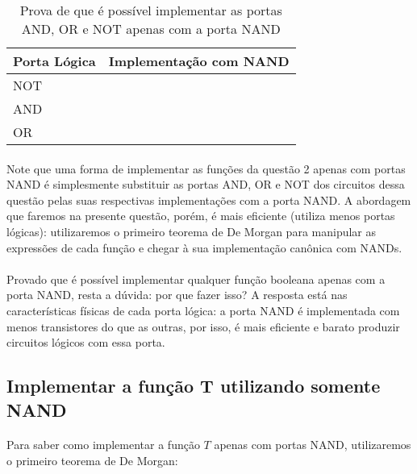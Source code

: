 \documentclass[a4paper, 12pt]{article}
\begin{document}
\begin{table}[H]
    \centering
    \begin{tabular}{|>{\centering\arraybackslash}m{}|>{\centering\arraybackslash}m{}|}
        \hline
        Porta Lógica & Implementação com NAND \\ \hline
        NOT &  \\ \hline
        AND &  \\ \hline
        OR &  \\ \hline
    \end{tabular}
    \caption{Prova de que é possível implementar as portas AND, OR e NOT apenas com a porta NAND}
\end{table}

\paragraph{}
Note que uma forma de implementar as funções da questão 2 apenas com portas NAND é simplesmente substituir as portas AND, OR e NOT dos circuitos dessa questão pelas suas respectivas implementações com a porta NAND. A abordagem que faremos na presente questão, porém, é mais eficiente (utiliza menos portas lógicas): utilizaremos o primeiro teorema de De Morgan para manipular as expressões de cada função e chegar à sua implementação canônica com NANDs.

\paragraph{}
Provado que é possível implementar qualquer função booleana apenas com a porta NAND, resta a dúvida: por que fazer isso? A resposta está nas características físicas de cada porta lógica: a porta NAND é implementada com menos transistores do que as outras, por isso, é mais eficiente e barato produzir circuitos lógicos com essa porta.

\subsection{Implementar a função T utilizando somente NAND}
\paragraph{}
Para saber como implementar a função $T$ apenas com portas NAND, utilizaremos o primeiro teorema de De Morgan:
\end{document}
